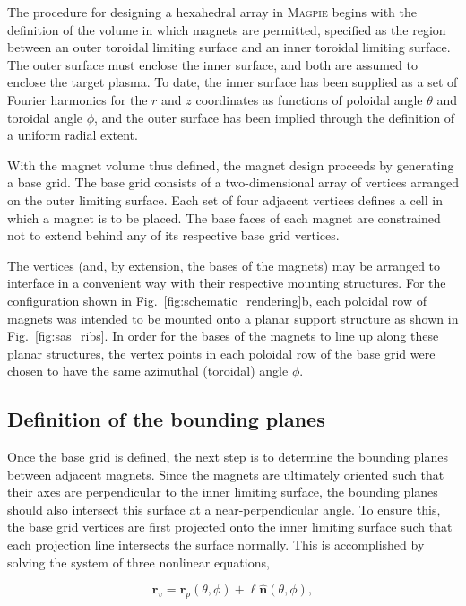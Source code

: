 \documentclass[11pt,onecolumn]{article}
\begin{document}
The procedure for designing a hexahedral array in \textsc{Magpie} begins
with the definition of the volume in which magnets are permitted, specified
as the region between an outer toroidal limiting surface and an inner toroidal
limiting surface. The outer surface must enclose the inner surface, and both
are assumed to enclose the target plasma. To date, the inner surface has
been supplied as a set of Fourier harmonics for the $r$ and $z$ coordinates
as functions of poloidal angle $\theta$ and toroidal angle $\phi$, and
the outer surface has been implied through the definition of a uniform
radial extent.

With the magnet volume thus defined, the magnet design proceeds by generating 
a base grid.
The base grid consists of a two-dimensional array of vertices arranged on
the outer limiting surface. Each set of four adjacent vertices defines
a cell in which a magnet is to be placed. The base faces of each magnet are 
constrained not to extend behind any of its respective base grid vertices. 

The vertices (and, by extension, the bases of the magnets) 
may be arranged to interface
in a convenient way with their respective mounting structures. For the 
configuration shown in Fig.~\ref{fig:schematic_rendering}b, each poloidal
row of magnets was intended to be mounted onto a planar support structure
as shown in Fig.~\ref{fig:sas_ribs}. In order for the bases of the
magnets to line up along these planar structures, the vertex points in
each poloidal row of the base grid were chosen to have the same azimuthal
(toroidal) angle $\phi$.

\subsection{Definition of the bounding planes}
\label{ssect:bounding_planes}

Once the base grid is defined, the next step is to determine the bounding
planes between adjacent magnets. Since the magnets are ultimately oriented
such that their axes are perpendicular to the inner limiting surface,
the bounding planes should also intersect this surface at a 
near-perpendicular angle. To ensure this, the base grid vertices are first
projected onto the inner limiting surface 
such that each projection line intersects the surface normally.
This is accomplished by solving the system of three nonlinear equations,

\begin{equation}
    \mathbf{r}_v = \mathbf{r}_p(\theta,\phi) 
        + \ell\hat{\mathbf{n}}(\theta,\phi),
\end{equation} 
\end{document}
